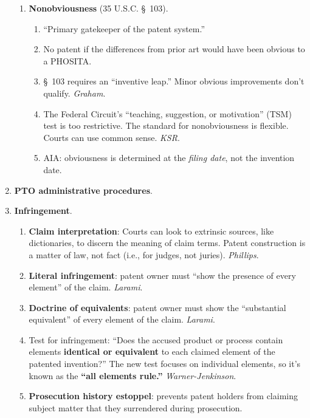 \begin{enumerate}
\begin{enumerate}
        \item \textbf{Nonobviousness} (35 U.S.C. \S\ 103).
        \begin{enumerate}
            \item ``Primary gatekeeper of the patent system.''
            \item No patent if the differences from prior art would have been 
            obvious to a PHOSITA.
            \item \S\ 103 requires an ``inventive leap.'' Minor obvious 
            improvements don't qualify. \emph{Graham}.
            \item The Federal Circuit's ``teaching, suggestion, or 
            motivation'' (TSM) test is too restrictive. The standard for 
            nonobviousness is flexible. Courts can use common sense. 
            \emph{KSR}.
            \item AIA: obviousness is determined at the \emph{filing date}, 
            not the invention date.
        \end{enumerate}
    \end{enumerate}
    \item \textbf{PTO administrative procedures}.
    \item \textbf{Infringement}.
    \begin{enumerate}
        \item \textbf{Claim interpretation}: Courts can look to extrinsic 
        sources, like dictionaries, to discern the meaning of claim terms. 
        Patent construction is a matter of law, not fact (i.e., for judges, 
        not juries).  \emph{Phillips}.
        \item \textbf{Literal infringement}: patent owner must ``show the 
        presence of every element'' of the claim. \emph{Larami}.
        \item \textbf{Doctrine of equivalents}: patent owner must show the 
        ``substantial equivalent'' of every element of the claim. 
        \emph{Larami}.
        \item Test for infringement: ``Does the accused product or process 
        contain elements \textbf{identical or equivalent} to each claimed 
        element of the patented invention?'' The new test focuses on 
        individual elements, so it's known as the \textbf{``all elements 
        rule.''} \emph{Warner-Jenkinson}.
        \item \textbf{Prosecution history estoppel}: prevents patent holders 
        from claiming subject matter that they surrendered during prosecution. 

\end{enumerate}
\end{enumerate}
